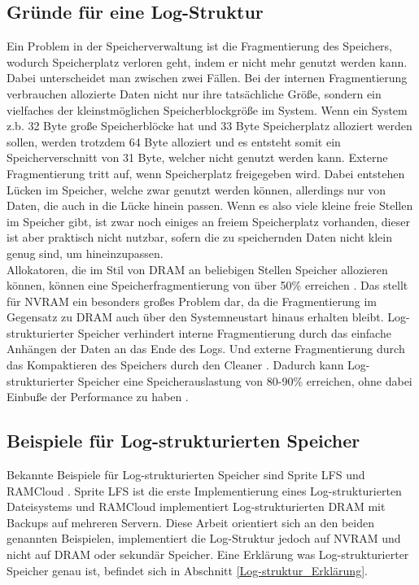 \documentclass{class/thesis}
\begin{document}
\begin{thesis}
	\section{Gründe für eine Log-Struktur}
	
	Ein Problem in der Speicherverwaltung ist die Fragmentierung des Speichers, wodurch Speicherplatz \glqq{}verloren\grqq{} geht, indem er nicht mehr genutzt werden kann. Dabei unterscheidet man zwischen zwei Fällen.
	Bei der internen Fragmentierung verbrauchen allozierte Daten nicht nur ihre tatsächliche Größe, sondern ein vielfaches der kleinstmöglichen Speicherblockgröße im System. Wenn ein System z.b. 32 Byte große Speicherblöcke hat und 33 Byte Speicherplatz alloziert werden sollen, werden trotzdem 64 Byte alloziert und es entsteht somit ein Speicherverschnitt von 31 Byte, welcher nicht genutzt werden kann.
	Externe Fragmentierung tritt auf, wenn Speicherplatz freigegeben wird. Dabei entstehen Lücken im Speicher, welche zwar genutzt werden können, allerdings nur von Daten, die auch in die Lücke hinein passen. Wenn es also viele kleine freie Stellen im Speicher gibt, ist zwar noch einiges an freiem Speicherplatz vorhanden, dieser ist aber praktisch nicht nutzbar, sofern die zu speichernden Daten nicht klein genug sind, um hineinzupassen.\\
	Allokatoren, die im Stil von DRAM an beliebigen Stellen Speicher allozieren können, können eine Speicherfragmentierung von über 50\% erreichen \cite{Rumble:FAST14}. Das stellt für NVRAM ein besonders großes Problem dar, da die Fragmentierung im Gegensatz zu DRAM auch über den Systemneustart hinaus erhalten bleibt.
	Log-strukturierter Speicher verhindert interne Fragmentierung durch das einfache Anhängen der Daten an das Ende des Logs. Und externe Fragmentierung durch das Kompaktieren des Speichers durch den Cleaner \cite{HU:ATC17}. 
	Dadurch kann Log-strukturierter Speicher eine Speicherauslastung von 80-90\% erreichen, ohne dabei Einbuße der Performance zu haben \cite{Rumble:FAST14}. 
	
	
	\subsection{Beispiele für Log-strukturierten Speicher}
	
	Bekannte Beispiele für Log-strukturierten Speicher sind Sprite LFS \cite{Rosenblum:1992} und RAMCloud \cite{Rumble:FAST14}. Sprite LFS ist die erste Implementierung eines Log-strukturierten Dateisystems und RAMCloud implementiert Log-strukturierten DRAM mit Backups auf mehreren Servern.
	Diese Arbeit orientiert sich an den beiden genannten Beispielen, implementiert die Log-Struktur jedoch auf NVRAM und nicht auf DRAM oder sekundär Speicher.
	Eine Erklärung was Log-strukturierter Speicher genau ist, befindet sich in Abschnitt \ref{Log-struktur_Erklärung}.


\end{thesis}
\end{document}

